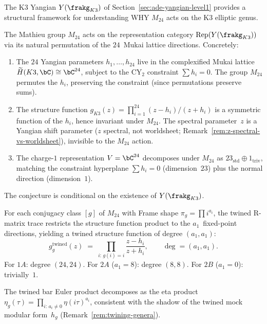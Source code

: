 The K3 Yangian $Y(\frakg_{K3})$ of
Section~\ref{sec:ade-yangian-level1} provides a structural
framework for understanding WHY $M_{24}$ acts on the K3
elliptic genus.

\begin{conjecture}
\label{conj:m24-yangian-action}
\ClaimStatusConjectured
{}
The Mathieu group $M_{24}$ acts on the representation category
$\mathrm{Rep}(Y(\frakg_{K3}))$ via its natural permutation
of the $24$~Mukai lattice directions. Concretely:
\begin{enumerate}[label=\textup{(\roman*)}]
\item
The $24$ Yangian parameters $h_1, \ldots, h_{24}$ live
in the complexified Mukai lattice
$\widetilde{H}(K3, \bC) \cong \bC^{24}$,
subject to the CY$_2$ constraint $\sum h_i = 0$.
The group $M_{24}$ permutes the $h_i$, preserving the
constraint (since permutations preserve sums).
\item
The structure function
$g_{K3}(z) = \prod_{i=1}^{24}(z - h_i)/(z + h_i)$
is a symmetric function of the $h_i$, hence invariant
under $M_{24}$. The spectral parameter~$z$ is a Yangian
shift parameter {\upshape(}$z$ spectral, not worldsheet;
Remark~\ref{rem:z-spectral-vs-worldsheet}{\upshape)},
invisible to the $M_{24}$ action.
\item
The charge-$1$ representation $V = \bC^{24}$ decomposes
under $M_{24}$ as $23_{\mathrm{std}} \oplus 1_{\mathrm{triv}}$,
matching the constraint hyperplane $\sum h_i = 0$ (dimension~$23$)
plus the normal direction (dimension~$1$).
\end{enumerate}
The conjecture is conditional on the existence of
$Y(\frakg_{K3})$.
\end{conjecture}

\begin{remark}
\label{rem:twined-structure-fn-yangian}
For each conjugacy class $[g]$ of $M_{24}$ with Frame
shape $\pi_g = \prod i^{a_i}$, the twined
R-matrix trace restricts the structure function product
to the $a_1$~fixed-point directions, yielding a twined
structure function of degree $(a_1, a_1)$:
\[
g_g^{\mathrm{twined}}(z)
\;=\;
\prod_{i:\, g(i) = i} \frac{z - h_i}{z + h_i},
\qquad
\deg = (a_1, a_1).
\]
For $1A$: degree $(24,24)$. For $2A$ ($a_1 = 8$):
degree $(8,8)$. For $2B$ ($a_1 = 0$): trivially~$1$.

The twined bar Euler product decomposes as the eta product
$\eta_g(\tau) = \prod_{i:\,a_i \neq 0} \eta(i\tau)^{a_i}$,
consistent with the shadow of the twined mock modular
form~$h_g$ (Remark~\ref{rem:twining-genera}).
\end{remark}

